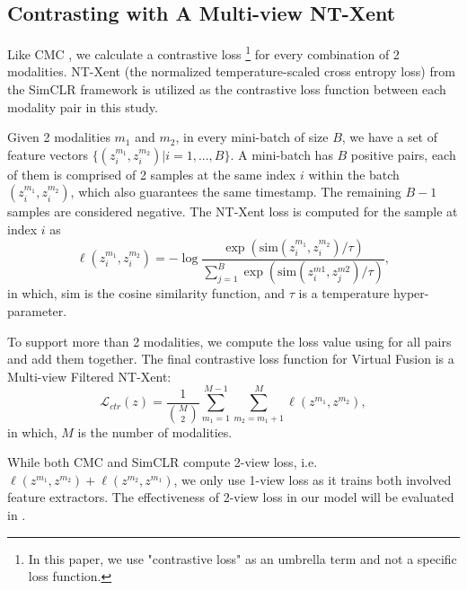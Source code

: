 \documentclass[conference]{IEEEtran}
\begin{document}
\subsection{Contrasting with A Multi-view NT-Xent}
Like CMC \cite{Tian2019}, we calculate a contrastive loss \footnote{In this paper, we use "contrastive loss" as an umbrella term and not a specific loss function.} for every combination of 2 modalities. NT-Xent (the normalized temperature-scaled cross entropy loss) from the SimCLR framework \cite{Chen2020} is utilized as the contrastive loss function between each modality pair in this study.

Given 2 modalities $m_1$ and $m_2$, in every mini-batch of size $B$, we have a set of feature vectors $\{(z^{m_1}_i, z^{m_2}_i) | i=1, ..., B\}$. A mini-batch has $B$ positive pairs, each of them is comprised of 2 samples at the same index $i$ within the batch $(z^{m_1}_i, z^{m_2}_i)$, which also guarantees the same timestamp. The remaining $B-1$ samples are considered negative. The NT-Xent loss is computed for the sample at index $i$ as
\begin{equation}
\label{eqn: ntxent}
    \ell(z^{m_1}_i, z^{m_2}_i) = -\log \frac{\exp(\text{sim}(z^{m_1}_i, z^{m_2}_i) / \tau)}{\sum_{j=1}^B \exp(\text{sim}(z^{m1}_i, z^{m2}_j) / \tau)},
\end{equation}
in which, sim is the cosine similarity function, and $\tau$ is a temperature hyper-parameter.



To support more than 2 modalities, we compute the loss value using  for all pairs and add them together. The final contrastive loss function for Virtual Fusion is a Multi-view Filtered NT-Xent:
\begin{equation}
    \mathcal{L}_{ctr}(z) = \frac{1}{\binom{M}{2}} \sum_{m_1=1}^{M-1} \sum_{m_2=m_1+1}^M \ell(z^{m_1}, z^{m_2}),
\end{equation}
in which, $M$ is the number of modalities.

While both CMC and SimCLR compute 2-view loss, i.e. $\ell(z^{m_1}, z^{m_2})+\ell(z^{m_2}, z^{m_1})$, we only use 1-view loss as it trains both involved feature extractors. The effectiveness of 2-view loss in our model will be evaluated in .
\end{document}
